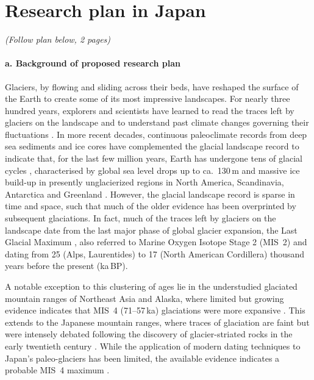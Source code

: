\documentclass{article}
\begin{document}
\section{Research plan in Japan}

    \emph{(Follow plan below, 2 pages)}

\paragraph{a. Background of proposed research plan}

    Glaciers, by flowing and sliding across their beds, have reshaped the
    surface of the Earth to create some of its most impressive landscapes. For
    nearly three hundred years, explorers and scientists have learned to read
    the traces left by glaciers on the landscape and to understand past climate
    changes governing their fluctuations \citep[e.g.,][]{Venetz.1821}.
    In more recent decades, continuous paleoclimate records from deep sea
    sediments and ice cores have complemented the glacial landscape record to
    indicate that, for the last few million years, Earth has undergone tens of
    glacial cycles \citep{Lisiecki.Raymo.2005}, characterised by global sea
    level drops up to ca.~130\,m and massive ice build-up in presently
    unglacierized regions in North America, Scandinavia, Antarctica and
    Greenland \citep{Ehlers.etal.2011}.
    However, the glacial landscape record is sparse in time and space, such
    that much of the older evidence has been overprinted by subsequent
    glaciations.  In fact, much of the traces left by glaciers on the landscape
    date from the last major phase of global glacier expansion, the Last
    Glacial Maximum \citep[LGM,][]{Heyman.etal.2011}, also referred to Marine
    Oxygen Isotope Stage 2 (MIS~2) and dating from 25 (Alps, Laurentides) to 17
    (North American Cordillera) thousand years before the present (ka\,BP).

    A notable exception to this clustering of ages lie in the understudied
    glaciated mountain ranges of Northeast Asia and Alaska, where limited but
    growing evidence indicates that MIS~4 (71--57\,ka) glaciations were more
    expansive \citep{Batchelor.etal.2019}. This extends to the Japanese
    mountain ranges, where traces of glaciation are faint but were intensely
    debated following the discovery of glacier-striated rocks in the early
    twentieth century \citep{Yamazaki.1902}. While the application of modern
    dating techniques to Japan's paleo-glaciers has been limited, the available
    evidence indicates a probable MIS~4 maximum \citep{Sawagaki.Aoki.2011}.
\end{document}
